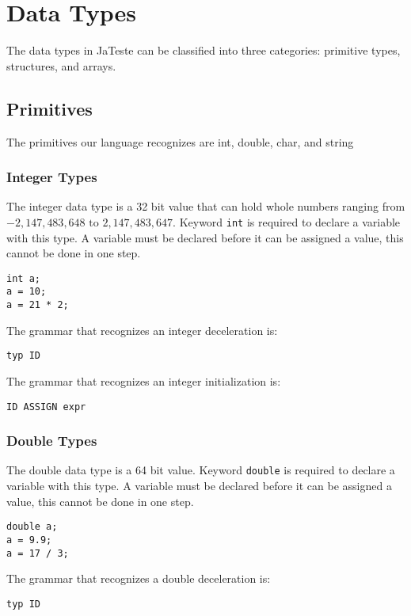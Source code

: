 \documentclass{article}
\begin{document}
\section{Data Types}
The data types in JaTeste can be classified into three categories: primitive types, structures, and arrays.

\subsection{Primitives}
The primitives our language recognizes are int, double, char, and string

\subsubsection{Integer Types}
The integer data type is a 32 bit value that can hold whole numbers ranging from $-2,147,483,648 \text{ to } 2,147,483,647$. Keyword \texttt{int} is required to declare a variable with this type.  A variable must be declared before it can be assigned a value, this cannot be done in one step.

\begin{lstlisting}
int a;
a = 10;
a = 21 * 2;
\end{lstlisting}

The grammar that recognizes an integer deceleration is: 
\begin{Verbatim}[frame=single]
typ ID
\end{Verbatim}

The grammar that recognizes an integer initialization is: 
\begin{Verbatim}[frame=single]
ID ASSIGN expr
\end{Verbatim}

\subsubsection{Double Types}
The double data type is a 64 bit value.  Keyword \texttt{double} is required to declare a variable with this type.  A variable must be declared before it can be assigned a value, this cannot be done in one step.

\begin{lstlisting}
double a;
a = 9.9;
a = 17 / 3;
\end{lstlisting}

The grammar that recognizes a double deceleration is: 
\begin{Verbatim}[frame=single]
typ ID
\end{Verbatim}
\end{document}
